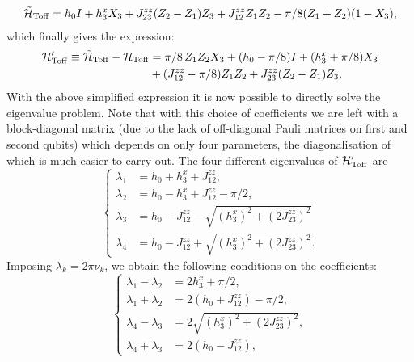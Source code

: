 \begin{equation}
\begin{aligned}
    \tilde{{\mathcal{H}}}_{\operatorname{Toff}} = h_0 I + h_3^x X_3 + J_{23}^{zz}(Z_2 - Z_1)Z_3
    + J_{12}^{zz} Z_1 Z_2 - \pi/8 ( Z_1 +  Z_2)(1 - X_3),
\end{aligned}
\end{equation}
which finally gives the expression:
\begin{equation}
\begin{aligned}
	{\mathcal{H}}'_{\operatorname{Toff}}{}\equiv \tilde{{\mathcal{H}}}_{\operatorname{Toff}}-{\mathcal{H}}_{\operatorname{Toff}} &=
		\pi/8\, Z_1 Z_2 X_3 + (h_0 - \pi/8)I
		+ (h_3^x + \pi/8) X_3 \\
		&+ (J_{12}^{zz} - \pi/8) Z_1 Z_2 +
		J_{23}^{zz} (Z_2 - Z_1)Z_3.
\end{aligned}
\label{eq:GL:toffoli_HPrime_reduced}
\end{equation}
With the above simplified expression it is now possible to directly solve the eigenvalue problem. Note that with this choice of coefficients we are left with a block-diagonal matrix (due to the lack of off-diagonal Pauli matrices on first and second qubits) which depends on only four parameters, the diagonalisation of which is much easier to carry out.
The four different eigenvalues of ${\mathcal{H}}'_{\operatorname{Toff}}{}$ are
\begin{equation}
\begin{cases}
    \lambda_1 &= h_0 + h_3^x + J_{12}^{zz}, \\
    \lambda_2 &= h_0 - h_3^x + J_{12}^{zz} - \pi/2, \\
    \lambda_3 &= h_0 - J_{12}^{zz}
                - \sqrt{(h_3^x)^2+ (2J_{23}^{zz})^2}\\
    \lambda_4 &= h_0 - J_{12}^{zz}
                + \sqrt{(h_3^x)^2+ (2J_{23}^{zz})^2}.
\end{cases}
\end{equation}
Imposing $\lambda_k=2\pi\nu_k$, we obtain the following conditions on the coefficients:
\begin{equation}
\begin{cases}
    \lambda_1 - \lambda_2 &= 2 h_3^x + \pi/2, \\
    \lambda_1 + \lambda_2 &= 2(h_0 + J_{12}^{zz}) - \pi/2, \\
    \lambda_4 - \lambda_3 &= 2\sqrt{(h_3^x)^2+ (2J_{23}^{zz})^2}, \\
    \lambda_4 + \lambda_3 &= 2(h_0 - J_{12}^{zz}),
\end{cases}
\label{eq:GL:toffoli_lambdas_vs_parameters}
\end{equation}

